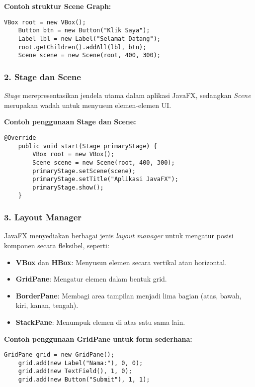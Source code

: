 \textbf{Contoh struktur Scene Graph:}
\begin{lstlisting}[style=JavaStyle, caption=Contoh penggunaan Scene Graph dalam JavaFX]
	VBox root = new VBox();
	Button btn = new Button("Klik Saya");
	Label lbl = new Label("Selamat Datang");
	root.getChildren().addAll(lbl, btn);
	Scene scene = new Scene(root, 400, 300);
\end{lstlisting}

\subsubsection{2. Stage dan Scene}
\textit{Stage} merepresentasikan jendela utama dalam aplikasi JavaFX, sedangkan \textit{Scene} merupakan wadah untuk menyusun elemen-elemen UI.

\textbf{Contoh penggunaan Stage dan Scene:}
\begin{lstlisting}[style=JavaStyle, caption=Contoh implementasi Stage dan Scene]
	@Override
	public void start(Stage primaryStage) {
		VBox root = new VBox();
		Scene scene = new Scene(root, 400, 300);
		primaryStage.setScene(scene);
		primaryStage.setTitle("Aplikasi JavaFX");
		primaryStage.show();
	}
\end{lstlisting}

\subsubsection{3. Layout Manager}
JavaFX menyediakan berbagai jenis \textit{layout manager} untuk mengatur posisi komponen secara fleksibel, seperti:
\begin{itemize}
	\item \textbf{VBox} dan \textbf{HBox}: Menyusun elemen secara vertikal atau horizontal.
	\item \textbf{GridPane}: Mengatur elemen dalam bentuk grid.
	\item \textbf{BorderPane}: Membagi area tampilan menjadi lima bagian (atas, bawah, kiri, kanan, tengah).
	\item \textbf{StackPane}: Menumpuk elemen di atas satu sama lain.
\end{itemize}

\textbf{Contoh penggunaan GridPane untuk form sederhana:}
\begin{lstlisting}[style=JavaStyle, caption=Contoh GridPane dalam JavaFX]
	GridPane grid = new GridPane();
	grid.add(new Label("Nama:"), 0, 0);
	grid.add(new TextField(), 1, 0);
	grid.add(new Button("Submit"), 1, 1);
\end{lstlisting}

